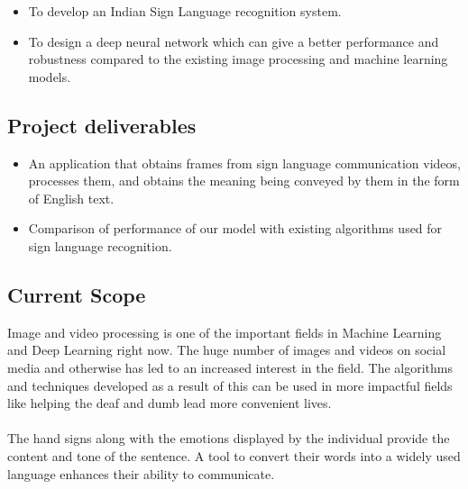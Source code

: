 \documentclass[12pt,oneside,a4paper]{article}
\begin{document}
			\begin{itemize}
				\item To develop an Indian Sign Language recognition system.
				\item To design a deep neural network which can give a better performance and robustness compared to the existing image processing and machine learning models.
			\end{itemize}

		\subsection{Project deliverables}
		
			\begin{itemize}
				\item An application that obtains frames from sign language communication videos, processes them, and obtains the meaning being conveyed by them in the form of English text.
				\item Comparison of performance of our model with existing algorithms used for sign language recognition.
			\end{itemize}

		\subsection{Current Scope}
			Image and video processing is one of the important fields in Machine Learning and Deep Learning right now. The huge number of images and videos on social media and otherwise has led to an increased interest in the field. The algorithms and techniques developed as a result of this can be used in more impactful fields like helping the deaf and dumb lead more convenient lives. \\
			\\
			The hand signs along with the emotions displayed by the individual provide the content and tone of the sentence. A tool to convert their words into a widely used language enhances their ability to communicate.
\end{document}
